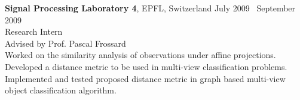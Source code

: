 
    \textbf{Signal Processing Laboratory 4}, EPFL, Switzerland \hfill July 2009 \textendash ~September 2009\vspace{0mm}\\\vspace{0mm}
	\hspace{-1mm}Research Intern  \hfill \vspace{0mm}\\\vspace{0mm}
	\hspace{-1mm}Advised by Prof. Pascal Frossard \hfill \vspace{2mm}\\\vspace{0mm}
	\hspace{-1mm}Worked on the similarity analysis of observations under affine projections. Developed a distance metric to be used in multi-view classification problems. Implemented and tested proposed distance metric in graph based multi-view object classification algorithm.